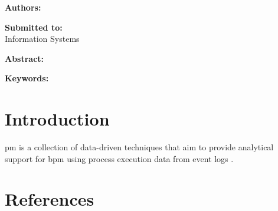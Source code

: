 \textbf{Authors: \\}

\textbf{Submitted to:\\}
Information Systems

\textbf{Abstract: \\}

\textbf{Keywords: \\}

\clearpage

\begin{refsection}

\section{Introduction}
\label{b:sec:intro}

\Ac{pm} is a collection of data-driven techniques that aim to provide analytical support for \ac{bpm} using process execution data from event logs \citep{Dumas.2018}. 


\section*{References}
\printbibliography[heading=none]
\end{refsection}